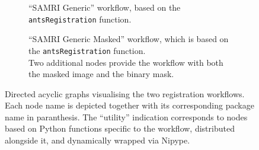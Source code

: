 \begin{figure}[h!]
	\begin{subfigure}{0.75\textwidth}
		\centering
		\vspace{-1.9em}
		\caption{
			“SAMRI Generic” workflow, based on the \textcolor{mg}{\texttt{antsRegistration}} function.
		}
		\label{fig:nwfgg}
	\end{subfigure}
	\begin{subfigure}{0.75\linewidth}
		\centering
		\vspace{-1.9em}
		\caption{
			“SAMRI Generic Masked” workflow, which is based on the \textcolor{mg}{\texttt{antsRegistration}} function.\\
		Two additional nodes provide the workflow with both the masked image and the binary mask.
			}
		\label{fig:nwfgl}
	\end{subfigure}\hfill
	\caption{
		Directed acyclic graphs visualising the two registration workflows.
		Each node name is depicted together with its corresponding package name in paranthesis.
		The “utility” indication corresponds to nodes based on Python functions specific to the workflow, distributed alongside it, and dynamically wrapped via Nipype.
		}
	\label{fig:nwfg}
\end{figure}


